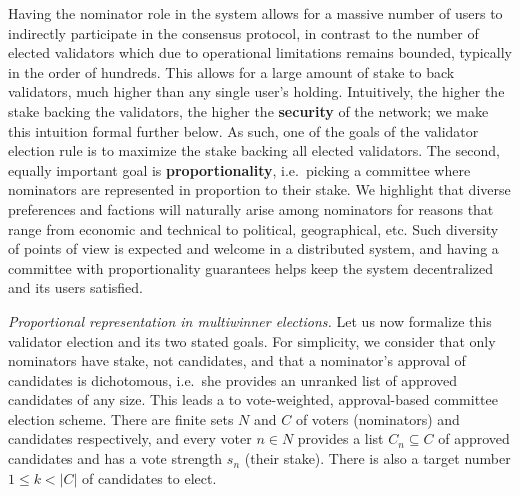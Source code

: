 Having the nominator role in the system allows for a massive number of users to indirectly participate in the consensus protocol, in contrast to the number of elected validators which due to operational limitations remains bounded, typically in the order of hundreds. 
This allows for a large amount of stake to back validators, much higher than any single user's holding. 
Intuitively, the higher the stake backing the validators, the higher the \textbf{security} of the network; we make this intuition formal further below. 
As such, one of the goals of the validator election rule is to maximize the stake backing all elected validators. 
The second, equally important goal is \textbf{proportionality}, i.e.~picking a committee where nominators are represented in proportion to their stake. 
We highlight that diverse preferences and factions will naturally arise among nominators for reasons that range from economic and technical to political, geographical, etc. 
Such diversity of points of view is expected and welcome in a distributed system, and having a committee with proportionality guarantees helps keep the system decentralized and its users satisfied.


\emph{Proportional representation in multiwinner elections.}
Let us now formalize this validator election and its two stated goals. 
For simplicity, we consider that only nominators have stake, not candidates, and that a nominator's approval of candidates is dichotomous, i.e.~she provides an unranked list of approved candidates of any size. 
This leads a to vote-weighted, approval-based committee election scheme. 
There are finite sets $N$ and $C$ of voters (nominators) and candidates respectively, and every voter $n\in N$ provides a list $C_n\subseteq C$ of approved candidates and has a vote strength $s_n$ (their stake). 
There is also a target number $1\leq k< |C|$ of candidates to elect.

